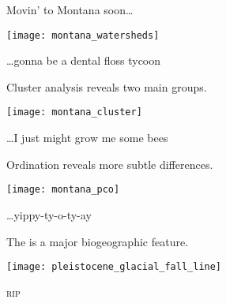 \documentclass[t]{beamer}
\begin{document}

\begin{frame}[t]{Movin’ to Montana soon\dots}

	\texttt{[image: montana\_watersheds]}
	
	\vfilll
	
	\hfill \tiny \textcolor{gray!60!white}{\dots gonna be a dental floss tycoon}
\end{frame}
%

\begin{frame}[t]{Cluster analysis reveals two main groups.}

	\texttt{[image: montana\_cluster]}

	\vfilll

\hfill \tiny \textcolor{gray!60!white}{\dots I just might grow me some bees}

\end{frame}
%
\begin{frame}[t]{Ordination reveals more subtle differences.}

	\texttt{[image: montana\_pco]}

	\vfilll

	\hfill \tiny \textcolor{gray!60!white}{\dots yippy-ty-o-ty-ay}

\end{frame}
%
\begin{frame}[t]{The  is a major biogeographic feature.}

\texttt{[image: pleistocene\_glacial\_fall\_line]}

\vfilll

\hfill \tiny \textcolor{gray!60!white}{\textsc{rip}}

\end{frame}
%
{
\begin{frame}[b]{}
	
\end{frame}
}
\end{document}
